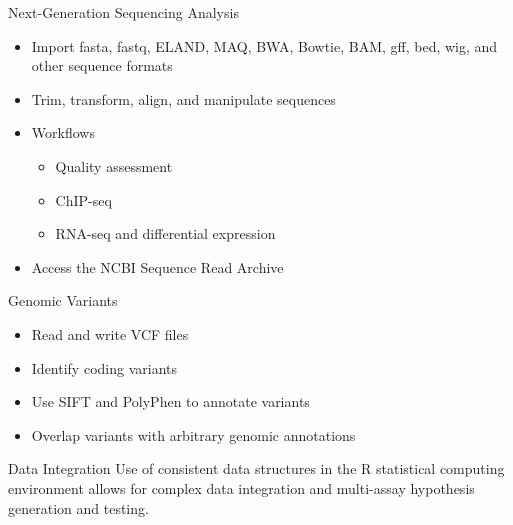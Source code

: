 \documentclass[final]{beamer}
\begin{document}
\begin{frame}[t]
\begin{columns}[t]
    \begin{column}{0.3\linewidth}
      \begin{block}{Next-Generation Sequencing Analysis}
        \begin{itemize}
          \item{Import fasta, fastq, ELAND, MAQ, BWA, Bowtie, BAM, gff, bed, wig, and other sequence formats} 
          \item{Trim, transform, align, and manipulate sequences}
          \item{Workflows}
            \begin{itemize}
              \item{Quality assessment}
              \item{ChIP-seq}
              \item{RNA-seq and differential expression}
            \end{itemize}
          \item{Access the NCBI Sequence Read Archive}
        \end{itemize}
      \end{block}
      \begin{block}{Genomic Variants}
        \begin{itemize}
          \item{Read and write VCF files}
          \item{Identify coding variants}
          \item{Use SIFT and PolyPhen to annotate variants}
          \item{Overlap variants with arbitrary genomic annotations}
        \end{itemize}
      \end{block}
      \begin{block}{Data Integration}
        Use of consistent data structures in the R statistical computing environment allows for complex data integration and multi-assay hypothesis generation and testing.
      \end{block}
    \end{column}
    \end{columns}
  \end{frame}
\end{document}

